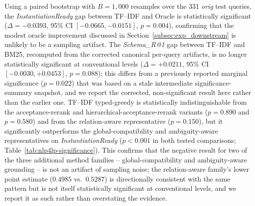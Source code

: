 \documentclass[pdflatex,sn-basic,Numbered]{sn-jnl}
\begin{document}
Using a paired bootstrap with $B=1{,}000$ resamples over the 331 \emph{orig} test queries, the \textit{InstantiationReady} gap between TF--IDF and Oracle is statistically significant ($\Delta=-0.0393$, 95\% CI $[-0.0665,-0.0151]$, $p=0.004$), confirming that the modest oracle improvement discussed in Section~\ref{subsec:exp_downstream} is unlikely to be a sampling artifact.
The \textit{Schema\_R@1} gap between TF--IDF and BM25, recomputed from the corrected canonical per-query artifacts, is no longer statistically significant at conventional levels ($\Delta=+0.0211$, 95\% CI $[-0.0030,+0.0453]$, $p=0.088$); this differs from a previously reported marginal significance ($p=0.022$) that was based on a stale intermediate significance-summary snapshot, and we report the corrected, non-significant result here rather than the earlier one. TF--IDF typed-greedy is statistically indistinguishable from the acceptance-rerank and hierarchical-acceptance-rerank variants ($p=0.890$ and $p=0.580$) and from the relation-aware representative ($p=0.150$), but it significantly outperforms the global-compatibility and ambiguity-aware representatives on \textit{InstantiationReady} ($p<0.001$ in both tested comparisons; Table~\ref{tab:nlp4lp-significance}). This confirms that the negative result for two of the three additional method families -- global-compatibility and ambiguity-aware grounding -- is not an artifact of sampling noise; the relation-aware family's lower point estimate ($0.4985$ vs.\ $0.5287$) is directionally consistent with the same pattern but is not itself statistically significant at conventional levels, and we report it as such rather than overstating the evidence.
\end{document}
